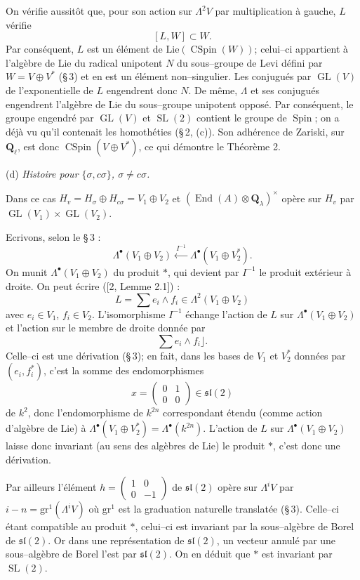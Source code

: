 \documentclass[11pt,a4paper]{article}
\theoremstyle{plain}
\theoremstyle{definition}
\DeclareMathOperator{\End}{End}
\DeclareMathOperator{\CSpin}{CSpin}
\DeclareMathOperator{\SL}{SL}
\DeclareMathOperator{\GL}{GL}
\DeclareMathOperator{\Spin}{Spin}
\begin{document}
On v\'erifie aussit\^ot que, pour son action sur $\Lambda^2 V$ par multiplication \`a gauche, $L$ v\'erifie
\[
[L, W] \subset W .
\]
Par cons\'equent, $L$ est un \'el\'ement de $\mathrm{Lie}(\CSpin(W))$; celui--ci appartient \`a l'alg\`ebre de Lie du radical unipotent $N$ du sous--groupe de Levi d\'efini par $W = V \oplus V^*$ (\S\,3) et en est un \'el\'ement non--singulier. Les conjugu\'es par $\GL(V)$ de l'exponentielle de $L$ engendrent donc $N$. De m\^eme, $\Lambda$ et ses conjugu\'es engendrent l'alg\`ebre de Lie du sous--groupe unipotent oppos\'e. Par cons\'equent, le groupe engendr\'e par $\GL(V)$ et $\SL(2)$ contient le groupe de $\Spin$; on a d\'ej\`a vu qu'il contenait les homoth\'eties (\S\,2, (c)). Son adh\'erence de Zariski, sur $\mathbf{Q}_\ell$, est donc $\CSpin(V \oplus V^*)$, ce qui d\'emontre le Th\'eor\`eme 2.

(d) \textit{Histoire pour $\{\sigma, c\sigma\}$, $\sigma \neq c\sigma$.}

Dans ce cas $H_v = H_\sigma \oplus H_{c\sigma} = V_1 \oplus V_2$ et $(\End(A) \otimes \mathbf{Q}_\lambda)^\times$ op\`ere sur $H_v$ par $\GL(V_1) \times \GL(V_2)$.

Ecrivons, selon le \S\,3 :
\[
\Lambda^\bullet(V_1 \oplus V_2) \xleftarrow{\ I^{-1}\ } \Lambda^\bullet(V_1 \oplus V_2^*) .
\]
On munit $\Lambda^\bullet(V_1 \oplus V_2)$ du produit $*$, qui devient par $I^{-1}$ le produit ext\'erieur \`a droite. On peut \'ecrire ([2, Lemme 2.1]) :
\[
L = \sum e_i \wedge f_i \in \Lambda^2(V_1 \oplus V_2)
\]
avec $e_i \in V_1$, $f_i \in V_2$. L'isomorphisme $I^{-1}$ \'echange l'action de $L$ sur $\Lambda^\bullet(V_1 \oplus V_2)$ et l'action sur le membre de droite donn\'ee par
\[
\sum e_i \wedge f_i \rfloor .
\]
Celle--ci est une d\'erivation (\S\,3); en fait, dans les bases de $V_1$ et $V_2^*$ donn\'ees par $(e_i, f_i^*)$, c'est la somme des endomorphismes
\[
x = \begin{pmatrix} 0 & 1 \\ 0 & 0 \end{pmatrix} \in \mathfrak{sl}(2)
\]
de $k^2$, donc l'endomorphisme de $k^{2n}$ correspondant \'etendu (comme action d'alg\`ebre de Lie) \`a $\Lambda^\bullet(V_1 \oplus V_2^*) = \Lambda^\bullet(k^{2n})$. L'action de $L$ sur $\Lambda^\bullet(V_1 \oplus V_2)$ laisse donc invariant (au sens des alg\`ebres de Lie) le produit $*$, c'est donc une d\'erivation.

Par ailleurs l'\'el\'ement $h = \begin{pmatrix} 1 & 0 \\ 0 & -1 \end{pmatrix}$ de $\mathfrak{sl}(2)$ op\`ere sur $\Lambda^i V$ par $i - n = \mathrm{gr}^1(\Lambda^i V)$ o\`u $\mathrm{gr}^1$ est la graduation naturelle translat\'ee (\S\,3). Celle--ci \'etant compatible au produit $*$, celui--ci est invariant par la sous--alg\`ebre de Borel de $\mathfrak{sl}(2)$. Or dans une repr\'esentation de $\mathfrak{sl}(2)$, un vecteur annul\'e par une sous--alg\`ebre de Borel l'est par $\mathfrak{sl}(2)$. On en d\'eduit que $*$ est invariant par $\SL(2)$.
\end{document}
